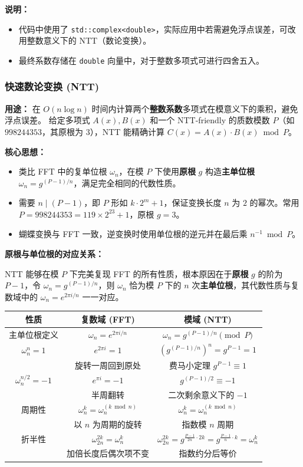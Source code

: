 \textbf{说明：}
\begin{itemize}
    \item 代码中使用了 \texttt{std::complex<double>}，实际应用中若需避免浮点误差，可改用整数意义下的 NTT（数论变换）。
    \item 最终系数存储在 \texttt{double} 向量中，对于整数多项式可进行四舍五入。
\end{itemize}

\subsubsection{快速数论变换 (NTT)}

\textbf{用途：}
在 $O(n\log n)$ 时间内计算两个\textbf{整数系数}多项式在模意义下的乘积，避免浮点误差。
给定多项式 $A(x),B(x)$ 和一个 NTT-friendly 的质数模数 $P$（如 $998244353$，其原根为 $3$），NTT 能精确计算 $C(x)=A(x)\cdot B(x) \bmod P$。

\textbf{核心思想：}
\begin{itemize}
    \item 类比 FFT 中的复单位根 $\omega_n$，在模 $P$ 下使用\textbf{原根} $g$ 构造\textbf{主单位根} $\omega_n = g^{(P-1)/n}$，满足完全相同的代数性质。
    \item 需要 $n \mid (P-1)$，即 $P$ 形如 $k\cdot 2^m+1$，保证变换长度 $n$ 为 $2$ 的幂次。常用 $P=998244353=119\times 2^{23}+1$，原根 $g=3$。
    \item 蝴蝶变换与 FFT 一致，逆变换时使用单位根的逆元并在最后乘 $n^{-1}\bmod P$。
\end{itemize}

\textbf{原根与单位根的对应关系：}

NTT 能够在模 $P$ 下完美复现 FFT 的所有性质，根本原因在于\textbf{原根} $g$ 的阶为 $P-1$，令 $\omega_n = g^{(P-1)/n}$，则 $\omega_n$ 恰为模 $P$ 下的 $n$ 次\textbf{主单位根}，其代数性质与复数域中的 $\omega_n = e^{2\pi i/n}$ 一一对应。

\begin{tabular}{|c|c|c|}
\hline
\textbf{性质} & \textbf{复数域 (FFT)} & \textbf{模域 (NTT)} \\ \hline
主单位根定义 & $\omega_n = e^{2\pi i/n}$ & $\omega_n = g^{(P-1)/n} \pmod{P}$ \\
\hline
$\omega_n^n = 1$ & $e^{2\pi i}=1$ & $\left(g^{(P-1)/n}\right)^n = g^{P-1} = 1$ \\
   & 旋转一周回到原处 & 费马小定理 $g^{P-1}\equiv 1$ \\
\hline
$\omega_n^{n/2} = -1$ & $e^{\pi i} = -1$ & $g^{(P-1)/2} \equiv -1$ \\
   & 半周翻转 & 二次剩余意义下的 $-1$ \\
\hline
周期性 & $\omega_n^k = \omega_n^{(k \bmod n)}$ & $\omega_n^k = \omega_n^{(k \bmod n)}$ \\
   & 以 $n$ 为周期的旋转 & 指数模 $n$ 周期 \\
\hline
折半性 & $\omega_{2n}^{2k} = \omega_n^k$ & $\omega_{2n}^{2k} = g^{\frac{P-1}{2n}\cdot 2k} = g^{\frac{P-1}{n}\cdot k} = \omega_n^k$ \\
   & 加倍长度后偶次项不变 & 指数约分后等价 \\
\hline
\end{tabular}

